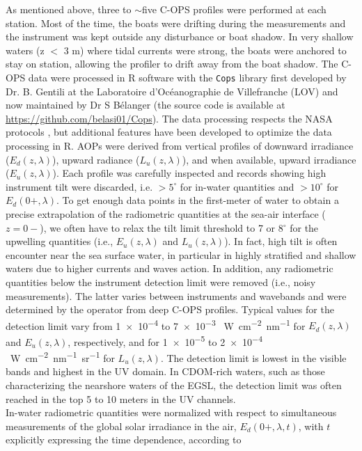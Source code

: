 \documentclass[essd, manuscript]{copernicus}
\begin{document}
As mentioned above, three to $\sim$five C-OPS profiles were performed at each station. Most of the time, the boats were drifting during the measurements and the instrument was kept outside any disturbance or boat shadow. In very shallow waters (z $<$ 3 m) where tidal currents were strong, the boats were anchored to stay on station, allowing the profiler to drift away from the boat shadow. The C-OPS data were processed in R software with the \texttt{Cops} library first developed by Dr. B. Gentili at the Laboratoire d'Océanographie de Villefranche (LOV) and now maintained by Dr S Bélanger (the source code is available at \url{https://github.com/belasi01/Cops}). The data processing respects the NASA protocols \citep{Mueller2003}, but additional features have been developed to optimize the data processing in R. AOPs were derived from vertical profiles of downward irradiance ($E_d(z,\lambda)$), upward radiance ($L_u(z,\lambda)$), and when available, upward irradiance ($E_u(z,\lambda)$). Each profile was carefully inspected and records showing high instrument tilt were discarded, i.e. $> 5^{\circ}$ for in-water quantities and $> 10^{\circ}$ for $E_d(0+,\lambda)$. To get enough data points in the first-meter of water to obtain a precise extrapolation of the radiometric quantities at the sea-air interface ($z=0-$), we often have to relax the tilt limit threshold to 7 or 8$^{\circ}$ for the upwelling quantities (i.e., $E_u(z,\lambda)$ and $L_u(z,\lambda)$). In fact, high tilt is often encounter near the sea surface water, in particular in highly stratified and shallow waters due to higher currents and waves action. In addition, any radiometric quantities below the instrument detection limit were removed (i.e., noisy measurements). The latter varies between instruments and wavebands and were determined by the operator from deep C-OPS profiles. Typical values for the detection limit vary from \num{1e-4} to \num{7e-3} \si{\micro.W.cm^{-2}.nm^{-1}} for $E_d(z,\lambda)$ and $E_u(z,\lambda)$, respectively, and for \num{1e-5} to \num{2e-4} \si{\micro.W.cm^{-2}.nm^{-1}.sr^{-1}} for $L_u(z,\lambda)$. The detection limit is lowest in the visible bands and highest in the UV domain. In CDOM-rich waters, such as those characterizing the nearshore waters of the EGSL, the detection limit was often reached in the top 5 to 10 meters in the UV channels.\\ 

In-water radiometric quantities were normalized with respect to simultaneous measurements of the global solar irradiance in the air, $E_d(0+,\lambda,t)$, with $t$ explicitly expressing the time dependence, according to
\end{document}

